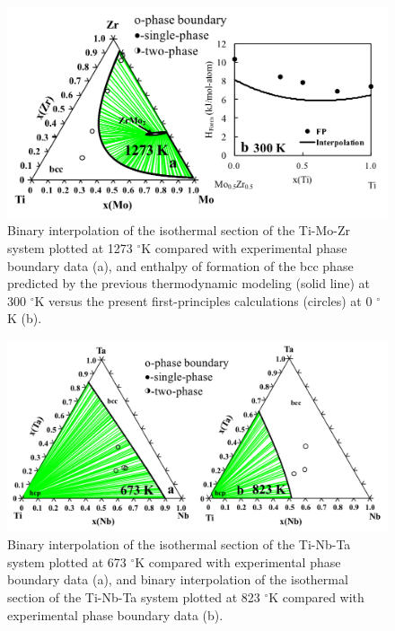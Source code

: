 \newpage
\begin{figure}[H]
	\centering
	\includegraphics[width=\textwidth]{Chapter-3/Figures/TiMoZr.png}
	\caption{Binary interpolation of the isothermal section of the Ti-Mo-Zr system plotted at 1273 $^{\circ}$K compared with experimental phase boundary data \cite{Kar2008,Prokoshkin1967} (a), and enthalpy of formation of the bcc phase predicted by the previous thermodynamic modeling (solid line) at 300 $^{\circ}$K versus the present first-principles calculations (circles) at 0 $^{\circ}$K (b).}
	\label{Ch3-figure:TiMoZr}
\end{figure}

\newpage
\begin{figure}[H]
	\centering
	\includegraphics[width=\textwidth]{Chapter-3/Figures/TiNbTa1.png}
	\caption{Binary interpolation of the isothermal section of the Ti-Nb-Ta system plotted at 673 $^{\circ}$K compared with experimental phase boundary data \cite{Na2001} (a), and binary interpolation of the isothermal section of the Ti-Nb-Ta system plotted at 823 $^{\circ}$K compared with experimental phase boundary data \cite{Na2001} (b).}
	\label{Ch3-figure:TiNbTa1}
\end{figure}

